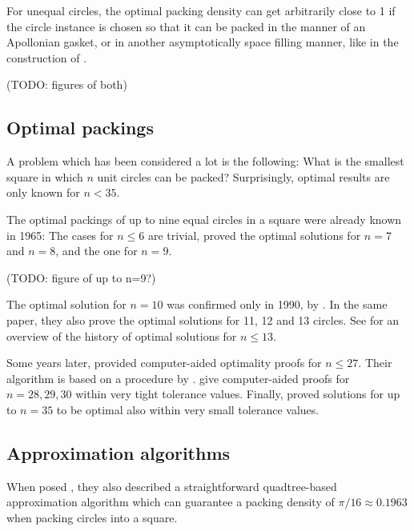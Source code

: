\documentclass[a4paper,style=print,oneside,bibliography=totoc,nexus,lnum,extramargin]{tubsbook}
\begin{document}
For unequal circles, the optimal packing density can get arbitrarily close to 1 if the circle instance is chosen so that it can be packed in the manner of an Apollonian gasket, or in another asymptotically space filling manner, like in the construction of \textcite{bourke2011random}.

(TODO: figures of both)

\subsection{Optimal packings}

A problem which has been considered a lot is the following: What is the smallest square in which $n$ unit circles can be packed?
Surprisingly, optimal results are only known for $n < 35$.

The optimal packings of up to nine equal circles in a square were already known in 1965: The cases for $n \le 6$ are trivial,
\textcite{schaer1965densest} proved the optimal solutions for $n = 7$ and $n = 8$, and \textcite{SM1965geometric} the one for $n = 9$.

(TODO: figure of up to n=9?)

The optimal solution for $n = 10$ was confirmed only in 1990, by \textcite{DPW1990optimal}. In the same paper, they also prove the optimal solutions for 11, 12 and 13 circles.
See \textcite{WMP1994history} for an overview of the history of optimal solutions for $n \le 13$.

Some years later, \textcite{NO1998more} provided computer-aided optimality proofs for $n \le 27$. Their algorithm is based on a procedure by \textcite{PWMD1992packing}.
\textcite{MC2005new} give computer-aided proofs for $n=28,29,30$ within very tight tolerance values.
Finally, \textcite{LR2002packing} proved solutions for up to $n=35$ to be optimal also within very small tolerance values.

\subsection{Approximation algorithms}

When \textcite{DFL2010circle} posed , they also described a straightforward quadtree-based approximation algorithm which can guarantee a packing density of $\pi/16 \approx 0.1963$ when packing circles into a square.
\end{document}
